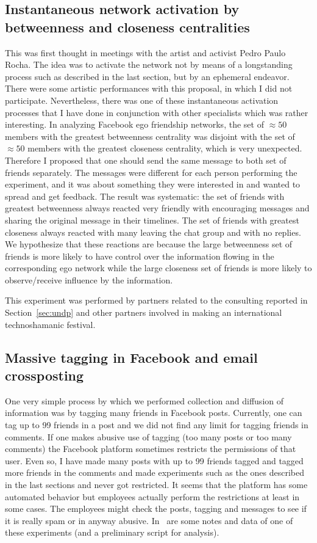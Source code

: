 \begin{apendicesenv}
\subsection{Instantaneous network activation by betweenness and closeness centralities}
This was first thought in meetings with the artist and activist Pedro Paulo Rocha.
The idea was to activate the network not by means of a longstanding process such
as described in the last section, but by an ephemeral endeavor.
There were some artistic performances with this proposal, in which I did
not participate.
Nevertheless, there was one of these instantaneous activation processes that
I have done in conjunction with other specialists which was rather interesting.
In analyzing Facebook ego friendship networks, the set of $\approx 50$ members with
the greatest betweenness centrality was disjoint with the set of $\approx 50$ members
with the greatest closeness centrality, which is very unexpected.
Therefore I proposed that one should send the same message to both set of friends separately.
The messages were different for each person performing the experiment,
and it was about something they were interested in and wanted to spread and get feedback.
The result was systematic: the set of friends with greatest betweenness always reacted very friendly
with encouraging messages and sharing the original message in their timelines.
The set of friends with greatest closeness always reacted with many leaving the chat group
and with no replies.
We hypothesize that these reactions are because the large betweenness set of friends is more
likely to have control over the information flowing in the corresponding ego network while
the large closeness set of friends is more likely to observe/receive influence by the information.

This experiment was performed by partners related to the consulting reported in Section~\ref{sec:undp}
and other partners involved in making an international technoshamanic festival.

\subsection{Massive tagging in Facebook and email crossposting}
One very simple process by which we performed collection and diffusion of information
was by tagging many friends in Facebook posts.
Currently, one can tag up to 99 friends in a post
and we did not find any limit for tagging friends in comments.
If one makes abusive use of tagging (too many posts or too many comments)
the Facebook platform sometimes restricts the permissions of that user.
Even so, I have made many posts with up to 99 friends tagged and tagged more
friends in the comments and made experiments such as the ones described in the
last sections and never got restricted.
It seems that the platform has some automated behavior but employees actually
perform the restrictions at least in some cases.
The employees might check the posts, tagging and messages to see if it is
really spam or in anyway abusive.
In~\cite{anExp} are some notes and data of one of these experiments (and a preliminary script for analysis).


\end{apendicesenv}
